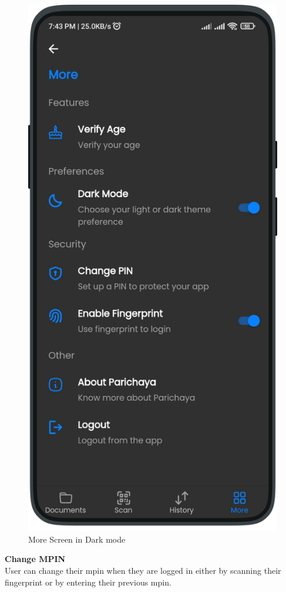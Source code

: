 \begin{multicols}{2}
\begin{figure}[H]
            \includegraphics[width=0.6\linewidth]{images/results/mobile/MoreDarkMode.png}
            \caption[More Screen in Dark mode]{More Screen in Dark mode} 
            \label{fig:MoreDarkMode.png}
            \end{figure}
           \end{multicols}

           \textbf{Change MPIN}\\
           User can change their mpin when they are logged in either by scanning their fingerprint or by entering their previous mpin.
           
